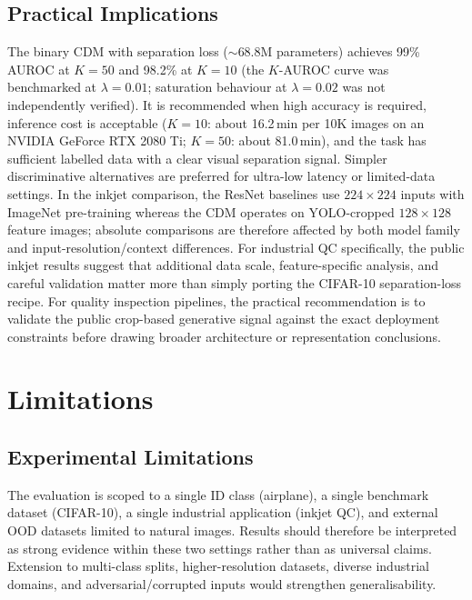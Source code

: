 \subsection{Practical Implications}
\label{sec:disc:implications:practical}

The binary CDM with separation loss (${\sim}68.8$M parameters) achieves
99\% AUROC at $K = 50$ and 98.2\% at $K = 10$ (the $K$-AUROC curve was
benchmarked at $\lambda{=}0.01$; saturation behaviour at $\lambda{=}0.02$
was not independently verified). It is recommended when
high accuracy is required, inference cost is acceptable ($K = 10$:
about 16.2\,min per 10K images on an NVIDIA GeForce RTX 2080 Ti;
$K = 50$: about 81.0\,min), and the task has sufficient labelled data
with a clear visual separation signal. Simpler discriminative
alternatives are preferred for ultra-low latency or limited-data
settings. In the inkjet comparison, the ResNet baselines use
$224{\times}224$ inputs with ImageNet pre-training whereas the CDM operates on
YOLO-cropped $128{\times}128$ feature images; absolute comparisons are
therefore affected by both model family and input-resolution/context
differences. For
industrial QC specifically, the public inkjet results suggest that
additional data scale, feature-specific analysis, and careful validation
matter more than simply porting the CIFAR-10 separation-loss recipe.
For quality inspection pipelines, the practical recommendation is to
validate the public crop-based generative signal against the exact
deployment constraints before drawing broader architecture or
representation conclusions.

\section{Limitations}
\label{sec:disc:limitations}

\subsection{Experimental Limitations}
\label{sec:disc:limitations:experimental}

The evaluation is scoped to a single ID class (airplane), a single
benchmark dataset (CIFAR-10), a single industrial application (inkjet
QC), and external OOD datasets limited to natural images. Results should
therefore be interpreted as strong evidence within these two settings
rather than as universal claims. Extension to multi-class splits,
higher-resolution datasets, diverse industrial domains, and
adversarial/corrupted inputs would strengthen generalisability.

